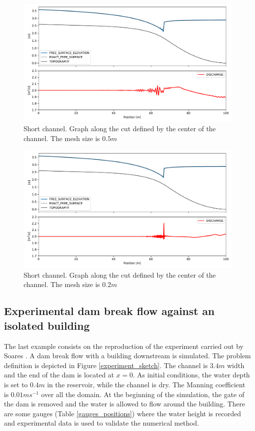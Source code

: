 \documentclass[a4paper,12pt]{elsarticle}
\begin{document}
\begin{figure}
    \centering
    \includegraphics[width=\textwidth]{img/jump/mesh_0.5.pdf}
    \caption{Short channel. Graph along the cut defined by the center of the channel. The mesh size is $0.5m$}
    \label{mac_donald_shock_graph_5}
\end{figure}

\begin{figure}
    \centering
    \includegraphics[width=\textwidth]{img/jump/mesh_0.2.pdf}
    \caption{Short channel. Graph along the cut defined by the center of the channel. The mesh size is $0.2m$}
    \label{mac_donald_shock_graph_2}
\end{figure}


\subsection{Experimental dam break flow against an isolated building}

The last example consists on the reproduction of the experiment carried out by Soares \cite{soares2007}.
A dam break flow with a building downstream is simulated. The problem definition is depicted in Figure \ref{experiment_sketch}. The channel is $3.4m$ width and the end of the dam is located at $x=0$.
As initial conditions, the water depth is set to $0.4m$ in the reservoir, while the channel is dry. The Manning coefficient is $0.01ms^{-1}$ over all the domain.
At the beginning of the simulation, the gate of the dam is removed and the water is allowed to flow around the building.
There are some gauges (Table \ref{gauges_positions}) where the water height is recorded and experimental data is used to validate the numerical method.
\end{document}
